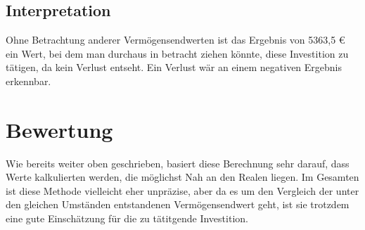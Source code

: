 \subsection{Interpretation}

Ohne Betrachtung anderer Vermögensendwerten ist das Ergebnis von 5363,5 € ein Wert, bei dem man durchaus in betracht ziehen könnte, diese Investition zu tätigen, da kein Verlust entseht. Ein Verlust wär an einem negativen Ergebnis erkennbar.

\section{Bewertung}

Wie bereits weiter oben geschrieben, basiert diese Berechnung sehr darauf, dass Werte kalkulierten werden, die möglichst Nah an den Realen liegen. Im Gesamten ist diese Methode vielleicht eher unpräzise, aber da es um den Vergleich der unter den gleichen Umständen entstandenen Vermögensendwert geht, ist sie trotzdem eine gute Einschätzung für die zu tätitgende Investition.
